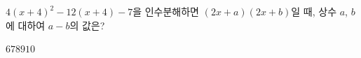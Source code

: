 $4(x+4)^2-12(x+4)-7$을 인수분해하면 $(2x+a)(2x+b)$일 때, 상수 $a$, $b$에 대하여 $a-b$의 값은? 
\begin{choices32}{$6$}{$7$}{$8$}{$9$}{$10$}\end{choices32}
